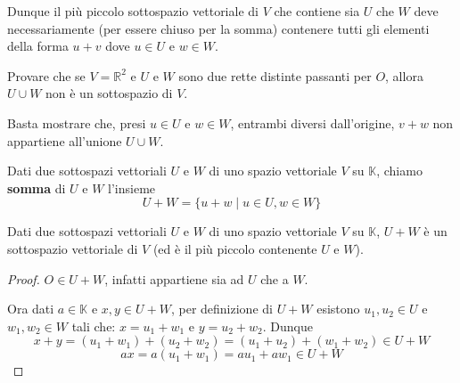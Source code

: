 Dunque il pi\`u piccolo sottospazio vettoriale di $V$ che contiene sia
$U$ che $W$ deve necessariamente (per essere chiuso per la somma)
contenere tutti gli elementi della forma $u + v$ dove $u \in U$ e
$w \in W$.

\begin{example}
	Provare che se $V = \mathbb{R}^2$ e $U$ e $W$ sono due rette distinte
	passanti per $O$, allora $U \cup W$ non \`e un sottospazio di $V$.

	Basta mostrare che, presi $u \in U$ e $w \in W$, entrambi diversi
	dall'origine, $v + w$ non appartiene all'unione $U \cup W$.
\end{example}

\begin{defn}
	Dati due sottospazi vettoriali $U$ e $W$ di uno spazio vettoriale $V$
	su $\mathbb{K}$, chiamo \textbf{somma} di $U$ e $W$ l'insieme
	\begin{equation*}
		U + W = \{u + w \mid u \in U, w \in W\}
	\end{equation*}
\end{defn}

\begin{proposition}

	Dati due sottospazi vettoriali $U$ e $W$ di uno spazio vettoriale $V$
	su $\mathbb{K}$, $U + W$ \`e un sottospazio vettoriale di $V$ (ed
	\`e il pi\`u piccolo contenente $U$ e $W$).
	\begin{proof}
		$O \in U + W$, infatti appartiene sia ad $U$ che a $W$.

		Ora dati $a \in \mathbb{K}$ e $x, y \in U + W$, per definizione di
		$U + W$ esistono $u_1, u_2 \in U$ e $w_1, w_2 \in W$ tali che:
		$x = u_1 + w_1$ e $y = u_2 + w_2$. Dunque
		\begin{equation*}
			x + y = (u_1 + w_1) + (u_2 + w_2) = (u_1 + u_2) + (w_1 + w_2) \in U + W
		\end{equation*}
		\begin{equation*}
			ax = a(u_1 + w_1) = au_1 + aw_1 \in U + W
		\end{equation*}
	\end{proof}
\end{proposition}
